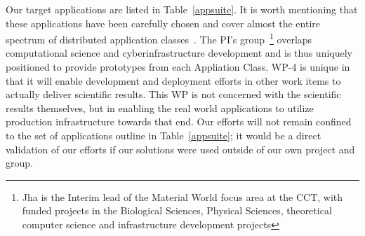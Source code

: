 \documentclass[10pt,letterpaper]{article}
\begin{document}
 Our target applications
are listed in Table~\ref{appsuite}.  It is worth mentioning that these
applications have been carefully chosen and cover almost the entire
spectrum of distributed application classes~\cite{dpa-paper}. The PI's
group~\footnote{Jha is the Interim lead of the Material World focus
  area at the CCT, with funded projects in the Biological Sciences,
  Physical Sciences, theoretical computer science and infrastructure
  development projects} overlaps computational science and
cyberinfrastructure development and is thus uniquely positioned to
provide prototypes from each Appliation Class.  WP-4 is unique in that
it will enable development and deployment efforts in other work items
to actually deliver scientific results.  This WP is not concerned with
the scientific results themselves, but in enabling the real world
applications to utilize production infrastructure towards that
end. Our efforts will not remain confined to the set of applications
outline in Table~\ref{appsuite}; it would be a direct validation of
our efforts if our solutions were used outside of our own project and
group.
\end{document}
